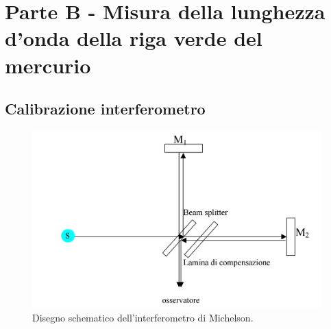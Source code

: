 \documentclass[10pt,a4paper]{article}
\begin{document}
\section{Parte B - Misura della lunghezza d'onda della riga verde del mercurio}
\subsection{Calibrazione interferometro}

\begin{figure}[!htb]
  \centering
  \includegraphics[scale=.5]{interferometro.png}
\caption{Disegno schematico dell'interferometro di Michelson.}
\label{int}
\end{figure}
\end{document}
